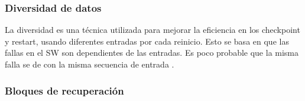 \begin{comment}

\begin{figure}[h]
 \centering
 \begin{tikzpicture}[node distance=1cm, auto,]
   \tikzset{
   cuadro/.style={
           rectangle,
           draw=black,
           text width=6.5em,
           minimum height=2em,
           text centered},
    arrow/.style={
           ->,
           thick,
           shorten <=2pt,
           shorten >=2pt,}	
    }
  \tikzstyle{circulo} = [draw, fill=black, circle, node distance=1cm, minimum size=5pt, inner 
sep=3pt]
    
  \node[inner sep=5pt] (entrada) {Entrada};
  \node[cuadro, right=0.5cm of entrada] (prim) {Procesador Primario};
  \node[cuadro, inner sep=5pt,below=0.5cm of prim] (secu) {Procesador Secundario};
  \node[cuadro, inner sep=10pt, right=1cm of prim] (selec) {Switch};
  \node[inner sep=0pt, right=2cm of selec](ghost1){};
  \node[cuadro, below=0.5cm of ghost1](detector) {Detector de error};
  \node[inner sep=0pt, right=0.5cm of ghost1] (salida) {Salida};
  
  \draw[arrow] (entrada)--(prim);
  \draw[arrow] (entrada)|-(secu);
  \draw[arrow, dashed] (prim.-30) -- (secu.30);
  \draw[arrow, dashed] (secu.150) -- (prim.-150);
  \draw[arrow] (prim)--(selec);
  \draw[arrow] (secu)-|(selec.-150);
  \draw[arrow] (detector)-|(selec);
  \draw[arrow] (selec)--(salida);
  \draw[arrow] (ghost1)--(detector);
 \end{tikzpicture}
 \caption{Representación del proceso pares}
 \label{fig:repPares}
\end{figure}

\end{comment}

\subsubsection{Diversidad de datos}
La diversidad es una técnica utilizada para mejorar la eficiencia en los checkpoint y restart, 
usando diferentes entradas por cada reinicio. Esto se basa en que las fallas en el 
\ac{SW} son dependientes de las entradas. Es poco probable que la misma falla se 
de con la misma secuencia de entrada \citep{FTDesign}.

\subsubsection{Bloques de recuperación}

